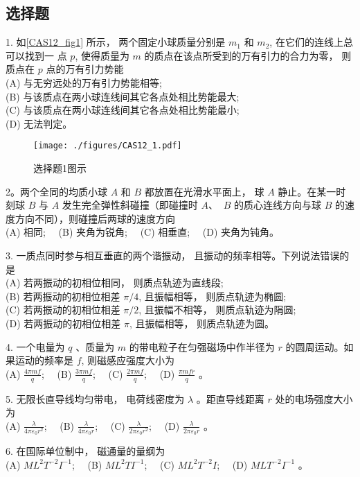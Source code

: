 \subsection{选择题}
1. 如\autoref{CAS12_fig1} 所示， 两个固定小球质量分别是 $m_{1}$ 和 $m_{2}$, 在它们的连线上总可以找到一
点 $p$, 使得质量为 $m$ 的质点在该点所受到的万有引力的合力为零， 则质点在 $p$
点的万有引力势能\\
(A) 与无穷远处的万有引力势能相等;\\
(B) 与该质点在两小球连线间其它各点处相比势能最大;\\
(C) 与该质点在两小球连线间其它各点处相比势能最小;\\
(D) 无法判定。
\begin{figure}[ht]
\centering
\texttt{[image: ./figures/CAS12\_1.pdf]}
\caption{选择题1图示} \label{CAS12_fig1}
\end{figure}
2。两个全同的均质小球 ${A}$ 和 ${B}$ 都放置在光滑水平面上， 球 ${A}$ 静止。在某一时刻球 ${B}$ 与 ${A}$ 发生完全弹性斜碰撞（即碰撞时 ${A}$、 ${~B}$ 的质心连线方向与球 ${B}$ 的速度方向不同），则碰撞后两球的速度方向\\
(A) 相同;$\quad$
(B) 夹角为锐角;$\quad$
(C) 相垂直;$\quad$
(D) 夹角为钝角。

3. 一质点同时参与相互垂直的两个谐振动， 且振动的频率相等。下列说法错误的是\\
(A) 若两振动的初相位相同， 则质点轨迹为直线段;\\
(B) 若两振动的初相位相差 $\pi / 4$, 且振幅相等， 则质点轨迹为椭圆;\\
(C) 若两振动的初相位相差 $\pi / 2$, 且振幅不相等， 则质点轨迹为䧎圆;\\
(D) 若两振动的初相位相差 $\pi$, 且振幅相等， 则质点轨迹为圆。

4. 一个电量为 $q$ 、质量为 $m$ 的带电粒子在匀强磁场中作半径为 $r$ 的圆周运动。如果运动的频率是 $f$, 则磁感应强度大小为\\
(A) $\frac{4 \pi m f}{q}$;$\quad$
(B) $\frac{3 \pi m f}{q}$;$\quad$
(C) $\frac{2 \pi m f}{q}$;$\quad$
(D) $\frac{\pi m f r}{q}$ 。

5. 无限长直导线均匀带电， 电荷线密度为 $\lambda$ 。距直导线距离 $r$ 处的电场强度大小为\\
(A) $\frac{\lambda}{4 \pi \varepsilon_{0} r^{2}}$;$\quad$
(B) $\frac{\lambda}{4 \pi \varepsilon_{0} r}$;$\quad$
(C) $\frac{\lambda}{2 \pi \varepsilon_{0} r^{2}}$;$\quad$
(D) $\frac{\lambda}{2 \pi \varepsilon_{0} r}$ 。

6. 在国际单位制中， 磁通量的量纲为\\
(A) $M L^{2} T^{-2} I^{-1}$;$\quad$
(B) $M L^{2} T I^{-1}$;$\quad$
(C) $M L^{2} T^{-2} I$;$\quad$
(D) $M L T^{-2} I^{-1}$ 。

